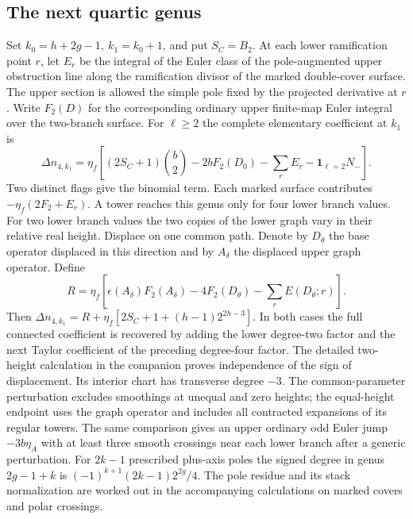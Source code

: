 \subsection{The next quartic genus}
Set \(k_0=h+2g-1,\ k_1=k_0+1\), and put \(S_C=B_2\). At each lower ramification point \(r\), let \(E_r\) be the integral of the Euler class of the pole-augmented upper obstruction line along the ramification divisor of the marked double-cover surface. The upper section is allowed the simple pole fixed by the projected derivative at \(r\). Write \(F_2(D)\) for the corresponding ordinary upper finite-map Euler integral over the two-branch surface. For \(\ell\ge2\) the complete elementary coefficient at \(k_1\) is
\[
 \Delta n_{4,k_1}=\eta_f\left[(2S_C+1)\binom b2-2bF_2(D_0)-\sum_r E_r
                   -\mathbf1_{\ell=2}N_-\right].
\]
Two distinct flags give the binomial term. Each marked surface contributes \(-\eta_f(2F_2+E_r)\). A tower reaches this genus only for four lower branch values. For two lower branch values the two copies of the lower graph vary in their relative real height. Displace on one common path. Denote by \(D_\theta\) the base operator displaced in this direction and by \(A_\delta\) the displaced upper graph operator. Define
\[
 R=\eta_f\left[\epsilon(A_\delta)F_2(A_\delta)-4F_2(D_\theta)
                   -\sum_r E(D_\theta;r)\right].
\]
Then \(\Delta n_{4,k_1}=R+\eta_f[2S_C+1+(h-1)2^{2h-3}]\).
In both cases the full connected coefficient is recovered by adding the lower degree-two factor and the next Taylor coefficient of the preceding degree-four factor. The detailed two-height calculation in the companion proves independence of the sign of displacement. Its interior chart has transverse degree \(-3\). The common-parameter perturbation excludes smoothings at unequal and zero heights; the equal-height endpoint uses the graph operator and includes all contracted expansions of its regular towers. The same comparison gives an upper ordinary odd Euler jump \(-3b\eta_A\) with at least three smooth crossings near each lower branch after a generic perturbation. For \(2k-1\) prescribed plus-axis poles the signed degree in genus \(2g-1+k\) is \((-1)^{k+1}(2k-1)2^{2g}/4\). The pole residue and its stack normalization are worked out in the accompanying calculations on marked covers and polar crossings.
